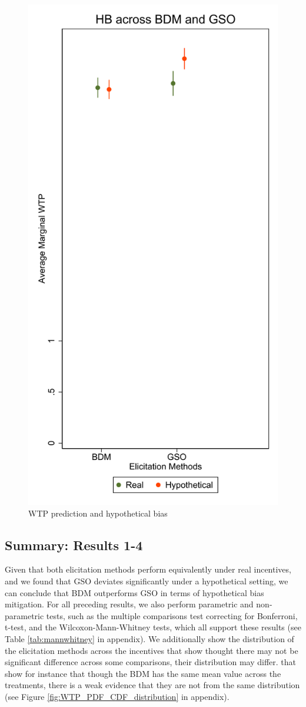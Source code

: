\documentclass[12pt]{article}
\begin{document}
\begin{figure}[H]
    \centering
    \includegraphics[width=0.7\linewidth]{Model50.pdf}
    \caption{WTP prediction and hypothetical bias}
    \label{fig:margin_hypo}
\end{figure}




\subsection{Summary: Results 1-4}

Given that both elicitation methods perform equivalently under real incentives, and we found that GSO deviates significantly under a hypothetical setting, we can conclude that BDM outperforms GSO in terms of hypothetical bias mitigation. For all preceding results, we also perform parametric and non-parametric tests, such as the multiple comparisons test correcting for Bonferroni, t-test, and the Wilcoxon-Mann-Whitney tests, which all support these results (see Table \ref{tab:mannwhitney} in appendix). We additionally show the distribution of the elicitation methods across the incentives that show thought there may not be significant difference across some comparisons, their distribution may differ.
that show for instance that though the BDM has the same mean value across the treatments, there is a weak evidence that they are not from the same distribution (see Figure \ref{fig:WTP_PDF_CDF_distribution} in appendix).
\end{document}
